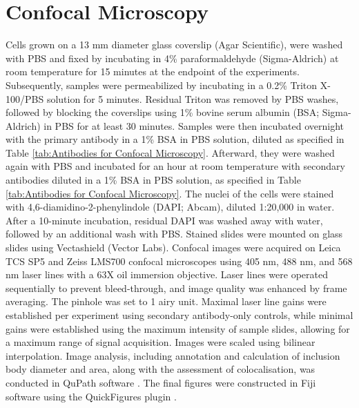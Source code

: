 \section{Confocal Microscopy} \label{sec:Confocal Microscopy}
Cells grown on a 13 mm diameter glass coverslip (Agar Scientific), were washed with PBS and fixed by incubating in 4\% paraformaldehyde (Sigma-Aldrich) at room temperature for 15 minutes at the endpoint of the experiments. Subsequently, samples were permeabilized by incubating in a 0.2\% Triton X-100/PBS solution for 5 minutes. Residual Triton was removed by PBS washes, followed by blocking the coverslips using 1\% bovine serum albumin (BSA; Sigma-Aldrich) in PBS for at least 30 minutes. Samples were then incubated overnight with the primary antibody in a 1\% BSA in PBS solution, diluted as specified in Table \ref{tab:Antibodies for Confocal Microscopy}. Afterward, they were washed again with PBS and incubated for an hour at room temperature with secondary antibodies diluted in a 1\% BSA in PBS solution, as specified in Table \ref{tab:Antibodies for Confocal Microscopy}. The nuclei of the cells were stained with 4,6-diamidino-2-phenylindole (DAPI; Abcam), diluted 1:20,000 in water. After a 10-minute incubation, residual DAPI was washed away with water, followed by an additional wash with PBS. Stained slides were mounted on glass slides using Vectashield (Vector Labs). Confocal images were acquired on Leica TCS SP5 and Zeiss LMS700 confocal microscopes using 405 nm, 488 nm, and 568 nm laser lines with a 63X oil immersion objective. Laser lines were operated sequentially to prevent bleed-through, and image quality was enhanced by frame averaging. The pinhole was set to 1 airy unit. Maximal laser line gains were established per experiment using secondary antibody-only controls, while minimal gains were established using the maximum intensity of sample slides, allowing for a maximum range of signal acquisition. Images were scaled using bilinear interpolation. Image analysis, including annotation and calculation of inclusion body diameter and area, along with the assessment of colocalisation, was conducted in QuPath software \cite{Bankhead2017QuPath:Analysis}. The final figures were constructed in Fiji software \cite{Schindelin2012Fiji:Analysis} using the QuickFigures plugin \cite{Mazo2021QuickFigures:Figures}.

